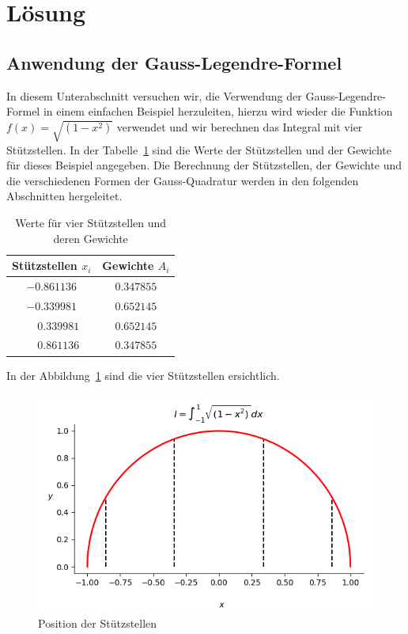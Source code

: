 %
%
%
\section{Lösung
\label{quadratur:section:loesung}}
\subsection{Anwendung der Gauss-Legendre-Formel
\label{quadratur:subsection:gausslegendreanwendung}}
In diesem Unterabschnitt versuchen wir, die Verwendung der Gauss-Legendre-Formel in einem
einfachen Beispiel herzuleiten, hierzu wird wieder die Funktion  
$f(x) = \sqrt{(1-x^2)}$ verwendet und 
wir berechnen das Integral mit vier Stützstellen.
In der Tabelle~\ref{buch:table:gaussbeispielwerte} sind die Werte der 
Stützstellen und der Gewichte für dieses Beispiel angegeben.
Die Berechnung der Stützstellen, der Gewichte
und die verschiedenen Formen der Gauss-Quadratur werden in den folgenden Abschnitten 
hergeleitet.
\begin{table}
    \centering
    \begin{tabular}{|c|c|}
        \hline
        Stützstellen $x_{i}$ & Gewichte $A_{i}$ \\
        \hline
        $-0.861136 $ & $ 0.347855 $ \\
        $-0.339981 $ & $ 0.652145 $ \\
        $\phantom{-} 0.339981 $ & $ 0.652145 $ \\
        $\phantom{-} 0.861136 $ & $ 0.347855 $ \\
        \hline
    \end{tabular}
    \caption{Werte für vier Stützstellen und deren Gewichte
    \label{buch:table:gaussbeispielwerte}}    
\end{table}
In der Abbildung~\ref{quadratur:figure:gausslegendre1} sind die vier Stützstellen 
ersichtlich.
\begin{figure}
    \centering
    \includegraphics[scale=0.7]{papers/quadratur/figures/GaussLegendre1.png}
    \caption{ Position der Stützstellen
    \label{quadratur:figure:gausslegendre1}}
\end{figure}
